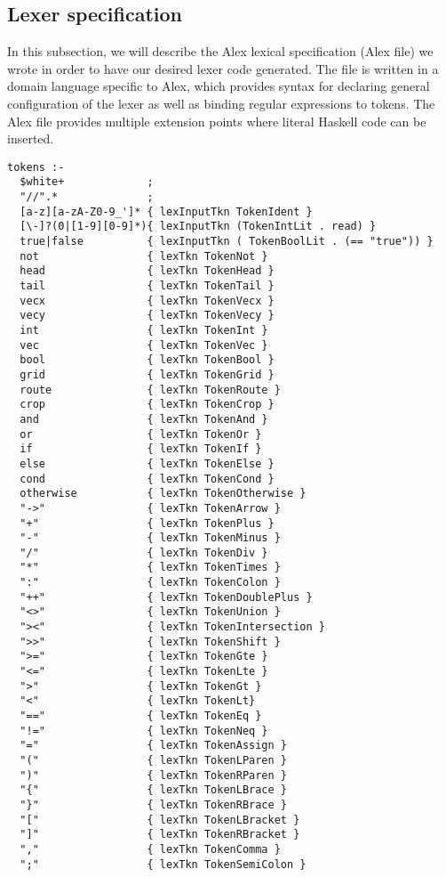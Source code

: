 \subsection{Lexer specification}
\label{sec:lexer:spec}
In this subsection, we will describe the Alex lexical specification (Alex file) we wrote in order to have our desired lexer code generated. The file is written in a domain language specific to Alex, which provides syntax for declaring general configuration of the lexer as well as binding regular expressions to tokens. The Alex file provides multiple extension points where literal Haskell code can be inserted. \cite{alexUserGuide}
\begin{lstlisting}[language=alex, float=p,
caption=Token specifications in Alex file,
label=lst:alex-tokens]
tokens :-
  $white+             ;
  "//".*              ;
  [a-z][a-zA-Z0-9_']* { lexInputTkn TokenIdent }
  [\-]?(0|[1-9][0-9]*){ lexInputTkn (TokenIntLit . read) }
  true|false          { lexInputTkn ( TokenBoolLit . (== "true")) }
  not                 { lexTkn TokenNot }
  head                { lexTkn TokenHead }
  tail                { lexTkn TokenTail }
  vecx                { lexTkn TokenVecx }
  vecy                { lexTkn TokenVecy }
  int                 { lexTkn TokenInt }
  vec                 { lexTkn TokenVec }
  bool                { lexTkn TokenBool }
  grid                { lexTkn TokenGrid }
  route               { lexTkn TokenRoute }
  crop                { lexTkn TokenCrop }
  and                 { lexTkn TokenAnd }
  or                  { lexTkn TokenOr }
  if                  { lexTkn TokenIf }
  else                { lexTkn TokenElse }
  cond                { lexTkn TokenCond }
  otherwise           { lexTkn TokenOtherwise }
  "->"                { lexTkn TokenArrow }
  "+"                 { lexTkn TokenPlus }
  "-"                 { lexTkn TokenMinus }
  "/"                 { lexTkn TokenDiv }
  "*"                 { lexTkn TokenTimes }
  ":"                 { lexTkn TokenColon }
  "++"                { lexTkn TokenDoublePlus }
  "<>"                { lexTkn TokenUnion }
  "><"                { lexTkn TokenIntersection }
  ">>"                { lexTkn TokenShift }
  ">="                { lexTkn TokenGte }
  "<="                { lexTkn TokenLte }
  ">"                 { lexTkn TokenGt }
  "<"                 { lexTkn TokenLt}
  "=="                { lexTkn TokenEq }
  "!="                { lexTkn TokenNeq }
  "="                 { lexTkn TokenAssign }
  "("                 { lexTkn TokenLParen }
  ")"                 { lexTkn TokenRParen }
  "{"                 { lexTkn TokenLBrace }
  "}"                 { lexTkn TokenRBrace }
  "["                 { lexTkn TokenLBracket }
  "]"                 { lexTkn TokenRBracket }
  ","                 { lexTkn TokenComma }
  ";"                 { lexTkn TokenSemiColon }
\end{lstlisting}
